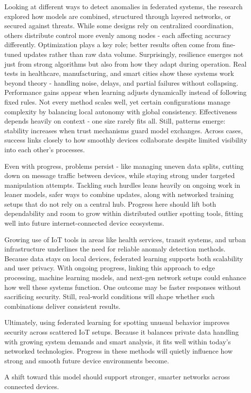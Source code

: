 \documentclass[12pt]{article}
\begin{document}
Looking at different ways to detect anomalies in federated systems, the research explored how models are combined, structured through layered networks, or secured against threats. While some designs rely on centralized coordination, others distribute control more evenly among nodes - each affecting accuracy differently. Optimization plays a key role; better results often come from fine-tuned updates rather than raw data volume. Surprisingly, resilience emerges not just from strong algorithms but also from how they adapt during operation. Real tests in healthcare, manufacturing, and smart cities show these systems work beyond theory - handling noise, delays, and partial failures without collapsing. Performance gains appear when learning adjusts dynamically instead of following fixed rules. Not every method scales well, yet certain configurations manage complexity by balancing local autonomy with global consistency. Effectiveness depends heavily on context - one size rarely fits all. Still, patterns emerge: stability increases when trust mechanisms guard model exchanges. Across cases, success links closely to how smoothly devices collaborate despite limited visibility into each other's processes.

Even with progress, problems persist - like managing uneven data splits, cutting down on message traffic between devices, while staying strong under targeted manipulation attempts. Tackling such hurdles leans heavily on ongoing work in leaner models, safer ways to combine updates, along with networked training setups that do not rely on a central hub. Progress here should lift both dependability and room to grow within distributed outlier spotting tools, fitting well into future internet-connected device ecosystems.

Growing use of IoT tools in areas like health services, transit systems, and urban infrastructure underlines the need for reliable anomaly detection methods. Because data stays on local devices, federated learning supports both scalability and user privacy. With ongoing progress, linking this approach to edge processing, machine learning models, and next-gen network setups could enhance how well these systems function. One outcome may be faster responses without sacrificing security. Still, real-world conditions will shape whether such combinations deliver consistent results.

Ultimately, using federated learning for spotting unusual behavior improves security across scattered IoT setups. Because it balances private data handling with growing system demands and smart analysis, it fits well within today’s networked technologies. Progress in these methods will quietly influence how strong and smooth future device environments become.

A shift toward this model should support stronger, smarter networks across connected devices.
     
	
    
    
\end{document}
